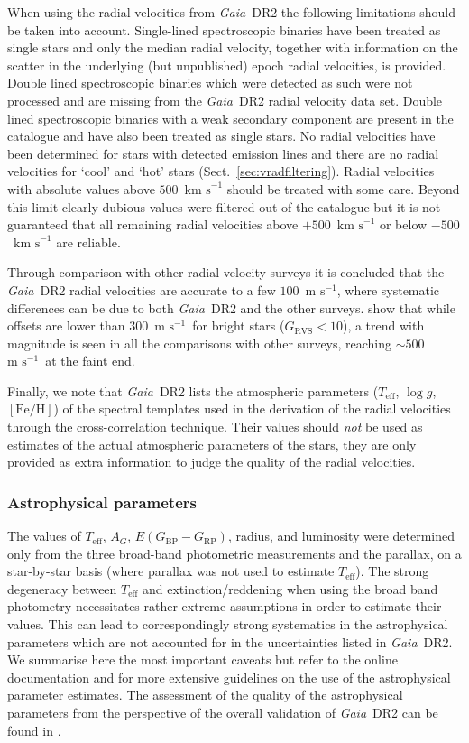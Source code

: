 \documentclass[longauth]{aa_gaia} %
\newcommand\gaia{\textit{Gaia}}
\newcommand\gdr[1]{\gaia~DR#1}
\newcommand\secref[1]{Sect.~\ref{#1}}
\newcommand\kms{\ensuremath{\text{km~s}^{-1}}}
\newcommand\ms{\ensuremath{\text{m~s}^{-1}}}
\newcommand\gbp{\ensuremath{G_\mathrm{BP}}}
\newcommand\grp{\ensuremath{G_\mathrm{RP}}}
\newcommand\grvs{\ensuremath{G_\mathrm{RVS}}}
\newcommand\teff{\ensuremath{T_\mathrm{eff}}}
\newcommand\logg{\ensuremath{\log g}}
\newcommand\feh{\ensuremath{[\text{Fe}/\text{H}]}}
\newcommand\ag{\ensuremath{A_G}}
\newcommand\ebpminrp{\ensuremath{E(\gbp-\grp)}}
\begin{document}
When using the radial velocities from \gdr{2} the following limitations should be taken into
account. Single-lined spectroscopic binaries have been treated as single stars and only the median
radial velocity, together with information on the scatter in the underlying (but unpublished) epoch
radial velocities, is provided. Double lined spectroscopic binaries which were detected as such were
not processed and are missing from the \gdr{2} radial velocity data set. Double lined spectroscopic
binaries with a weak secondary component are present in the catalogue and have also been treated as
single stars. No radial velocities have been determined for stars with detected emission lines and
there are no radial velocities for `cool' and `hot' stars (\secref{sec:vradfiltering}). Radial
velocities with absolute values above $500$~{\kms} should be treated with some care. Beyond this
limit clearly dubious values were filtered out of the catalogue but it is not guaranteed that all
remaining radial velocities above $+500$~{\kms} or below $-500$~{\kms} are reliable.

Through comparison with other radial velocity surveys it is concluded that the \gdr{2} radial
velocities are accurate to a few $100$~\ms, where systematic differences can be due to both \gdr{2}
and the other surveys. \cite{DR2-DPACP-54} show that while offsets are lower than $300$~\ms\ for
bright stars ($\grvs<10$),  a trend with magnitude is seen in all the comparisons with other
surveys, reaching $\sim500$~\ms\ at the faint end.

Finally, we note that \gdr{2} lists the atmospheric parameters (\teff, \logg, \feh) of the
spectral templates used in the derivation of the radial velocities through the cross-correlation
technique. Their values should {\em not} be used as estimates of the actual atmospheric
parameters of the stars, they are only provided as extra information to judge the quality of
the radial velocities.

\subsubsection{Astrophysical parameters}
\label{sec:apcaveats}

The values of \teff, \ag, \ebpminrp, radius, and luminosity were determined only from the three
broad-band photometric measurements and the parallax, on a star-by-star basis (where parallax was
not used to estimate {\teff}). The strong degeneracy between {\teff} and extinction/reddening when
using the broad band photometry necessitates rather extreme assumptions in order to estimate their
values. This can lead to correspondingly strong systematics in the astrophysical parameters which
are not accounted for in the uncertainties listed in \gdr{2}. We summarise here the most important
caveats but refer to the online documentation and \cite{DR2-DPACP-43} for more extensive guidelines
on the use of the astrophysical parameter estimates. The assessment of the quality of the
astrophysical parameters from the perspective of the overall validation of \gdr{2} can be found in
\cite{DR2-DPACP-39}.
\end{document}
